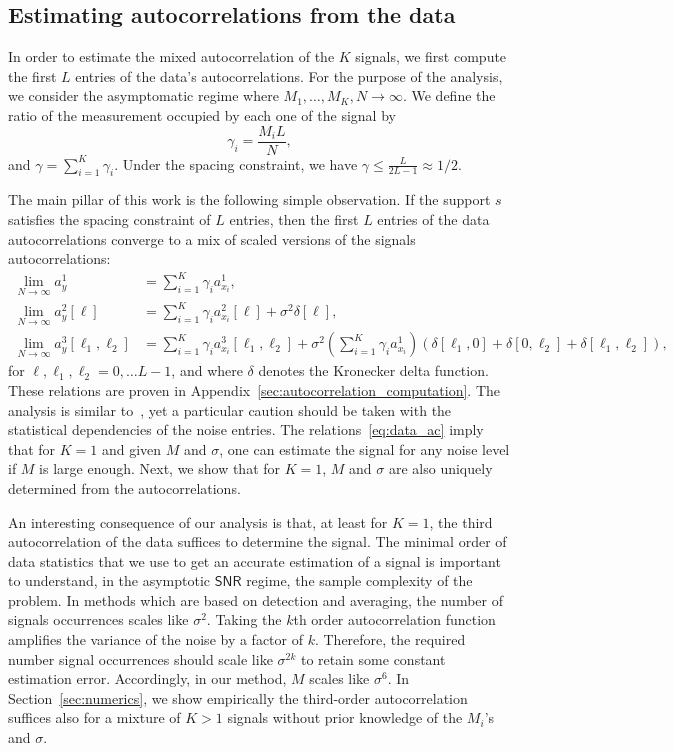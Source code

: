 \documentclass[english,11pt]{article}
\numberwithin{equation}{section}
\theoremstyle{plain}
\theoremstyle{definition}
\theoremstyle{remark}
\theoremstyle{plain}
\theoremstyle{remark}
\theoremstyle{plain}
\theoremstyle{plain}
\newcommand{\SNR}{{\textsf{SNR}}}
\begin{document}
\subsection{Estimating autocorrelations from the data} \label{sec:estimating_ac}

In order to estimate the mixed autocorrelation of the $K$ signals, we first compute the first $L$ entries of the data's autocorrelations. For the purpose of the analysis, we consider  the asymptomatic regime where $M_1,\ldots,M_K,N\to\infty$. We define the ratio of the measurement occupied by each one of the signal by
\begin{equation}
\gamma_i = \frac{M_i L}{N},
\end{equation}
and $\gamma = \sum_{i=1}^K\gamma_i$. 
Under the spacing constraint, we have $\gamma\leq\frac{L}{2L-1}\approx 1/2$.

The main pillar of this work is the following simple observation.
If the support $s$ satisfies the spacing constraint of $L$ entries, then the first $L$ entries of the data autocorrelations converge to a mix of scaled versions of the signals autocorrelations:
\begin{align} \label{eq:data_ac}
\lim_{N\to\infty} a_y^1 &= \sum_{i=1}^K\gamma_i a_{x_i}^1, \nonumber\\
\lim_{N\to\infty} a_y^2[\ell] &= \sum_{i=1}^K\gamma_i a_{x_i}^2[\ell] +\sigma^2\delta[\ell],\\
\lim_{N\to\infty} a_y^3[\ell_1,\ell_2] &= \sum_{i=1}^K\gamma_i a_{x_i}^3[\ell_1,\ell_2] + \sigma^2\left(\sum_{i=1}^K\gamma_i a_{x_i}^1\right)(\delta[\ell_1,0]+\delta[0,\ell_2]+\delta[\ell_1,\ell_2]), \nonumber
\end{align}
for $\ell,\ell_1,\ell_2=0,\ldots L-1$, and where $\delta$ denotes the Kronecker delta function. 
These relations are proven in Appendix~\ref{sec:autocorrelation_computation}. The analysis is similar to~\cite{bendory2017bispectrum,boumal2017heterogeneous}, yet a particular caution should be taken with the statistical dependencies of the noise entries. 
The relations~\eqref{eq:data_ac} imply that for $K=1$ and given $M$ and $\sigma$, one can estimate the signal for any noise level if $M$ is large enough. Next, we show that for $K=1$,  $M$ and $\sigma$ are also uniquely determined from the autocorrelations. 

An interesting consequence of our analysis is that, at least for $K=1$, the third autocorrelation of the data suffices to determine the signal. 
The minimal order of data statistics that we use to get an accurate estimation of a signal is important to understand, in the asymptotic $\SNR$ regime, the sample complexity of the problem.
In methods which are based on detection and averaging, the number of signals occurrences  scales like $\sigma^2$. Taking the $k$th order autocorrelation function amplifies the variance of the noise by a factor of $k$. Therefore, the required number signal occurrences should scale like $\sigma^{2k}$  to retain some constant estimation error. Accordingly, in our  method, $M$ scales like $\sigma^6$. In Section~\ref{sec:numerics}, we show empirically the third-order autocorrelation suffices also for a mixture of $K>1$ signals without prior knowledge of the $M_i$'s and $\sigma$. 
\end{document}
